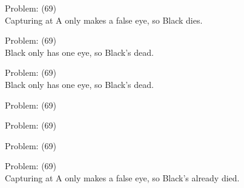 \documentclass[11pt]{article}
\begin{document}
\begin{minipage}[t]{0.5\textwidth}
  {\centering
  
  Problem: (69)\\
  Capturing at A only makes a false eye, so Black dies.\\
  }
\end{minipage}
\begin{minipage}[t]{0.5\textwidth}
  {\centering
  
  Problem: (69)\\
  Black only has one eye, so Black's dead.\\
  }
\end{minipage}
\begin{minipage}[t]{0.5\textwidth}
  {\centering
  
  Problem: (69)\\
  Black only has one eye, so Black's dead.\\
  }
\end{minipage}
\begin{minipage}[t]{0.5\textwidth}
  {\centering
  
  Problem: (69)\\
  
  }
\end{minipage}
\begin{minipage}[t]{0.5\textwidth}
  {\centering
  
  Problem: (69)\\
  
  }
\end{minipage}
\begin{minipage}[t]{0.5\textwidth}
  {\centering
  
  Problem: (69)\\
  
  }
\end{minipage}
\begin{minipage}[t]{0.5\textwidth}
  {\centering
  
  Problem: (69)\\
  Capturing at A only makes a false eye, so Black's already died.\\
  }
\end{minipage}
\end{document}
